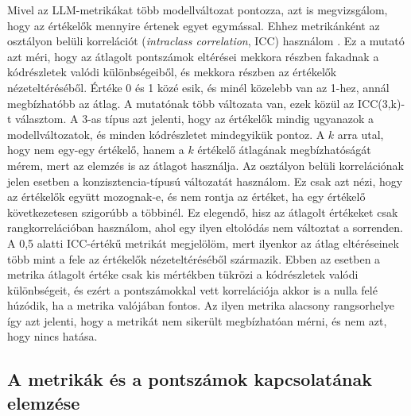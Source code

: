 \documentclass[
]{elteikthesis}[2024/04/26]
\begin{document}
Mivel az LLM-metrikákat több modellváltozat pontozza, azt is megvizsgálom, hogy
az értékelők mennyire értenek egyet egymással. Ehhez metrikánként az osztályon
belüli korrelációt (\textit{intraclass correlation}, ICC) használom
\cite{shrout1979intraclass}. Ez a mutató azt méri, hogy az átlagolt pontszámok
eltérései mekkora részben fakadnak a kódrészletek valódi különbségeiből, és
mekkora részben az értékelők nézeteltéréséből. Értéke 0 és 1 közé esik, és minél
közelebb van az 1-hez, annál megbízhatóbb az átlag. A mutatónak több változata
van, ezek közül az ICC(3,k)-t választom. A 3-as típus azt jelenti, hogy az
értékelők mindig ugyanazok a modellváltozatok, és minden kódrészletet
mindegyikük pontoz. A $k$ arra utal, hogy nem egy-egy értékelő, hanem a $k$
értékelő átlagának megbízhatóságát mérem, mert az elemzés is az átlagot
használja. Az osztályon belüli korrelációnak jelen esetben a
konzisztencia-típusú változatát használom. Ez csak azt nézi, hogy az értékelők
együtt mozognak-e, és nem rontja az értéket, ha egy értékelő következetesen
szigorúbb a többinél. Ez elegendő, hisz az átlagolt értékeket csak
rangkorrelációban használom, ahol egy ilyen eltolódás nem változtat a sorrenden.
A 0,5 alatti ICC-értékű metrikát megjelölöm, mert ilyenkor az átlag eltéréseinek
több mint a fele az értékelők nézeteltéréséből származik. Ebben az esetben a
metrika átlagolt értéke csak kis mértékben tükrözi a kódrészletek valódi
különbségeit, és ezért a pontszámokkal vett korrelációja akkor is a nulla felé
húzódik, ha a metrika valójában fontos. Az ilyen metrika alacsony rangsorhelye
így azt jelenti, hogy a metrikát nem sikerült megbízhatóan mérni, és nem azt,
hogy nincs hatása.

\subsection{A metrikák és a pontszámok kapcsolatának elemzése}
\end{document}
